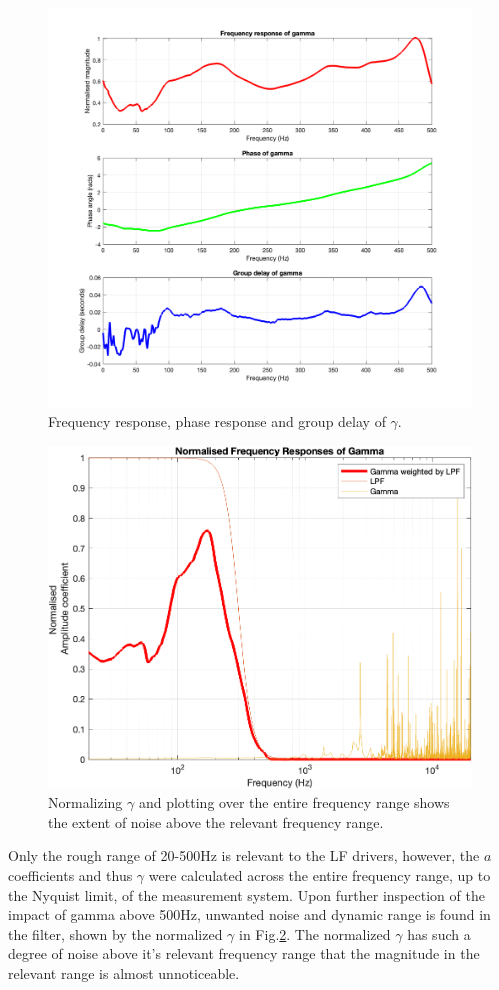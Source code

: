 \documentclass{report}
\begin{document}
            \begin{figure}[H]
                \centering
                \includegraphics[width = 0.75\linewidth]{figs/grpDelay.png}%
                \caption{Frequency response, phase response and group delay of $\gamma$.}
                \label{grpDelay}
            \end{figure}

            \begin{figure}[H]
                \centering
                \includegraphics[width = 0.6\linewidth]{figs/gammaCompare.png}%
                \caption{Normalizing $\gamma$ and plotting over the entire frequency range shows the extent of noise above the relevant frequency range.}
                \label{gammaCompare}
            \end{figure}

            Only the rough range of 20-500Hz is relevant to the LF drivers, however, the $a$ coefficients and thus $\gamma$ were calculated across the entire frequency range, up to the Nyquist limit, of the measurement system.
            Upon further inspection of the impact of gamma above 500Hz, unwanted noise and dynamic range is found in the filter, shown by the normalized $\gamma$ in Fig.\ref{gammaCompare}.
            The normalized $\gamma$ has such a degree of noise above it's relevant frequency range that the magnitude in the relevant range is almost unnoticeable.
\end{document}

